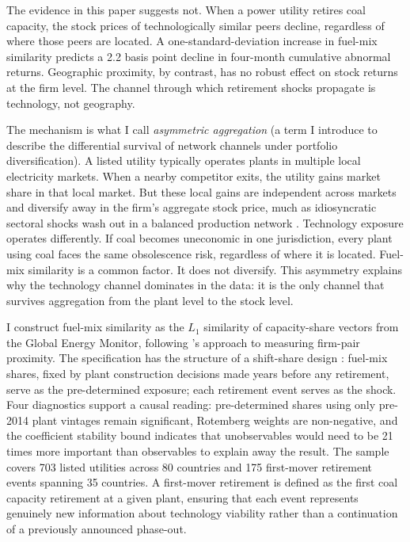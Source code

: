 \documentclass[12pt,a4paper]{article}
\begin{document}
The evidence in this paper suggests not. When a power utility retires coal capacity, the stock prices of technologically similar peers decline, regardless of where those peers are located. A one-standard-deviation increase in fuel-mix similarity predicts a 2.2 basis point decline in four-month cumulative abnormal returns. Geographic proximity, by contrast, has no robust effect on stock returns at the firm level. The channel through which retirement shocks propagate is technology, not geography.

The mechanism is what I call \emph{asymmetric aggregation} (a term I introduce to describe the differential survival of network channels under portfolio diversification). A listed utility typically operates plants in multiple local electricity markets. When a nearby competitor exits, the utility gains market share in that local market. But these local gains are independent across markets and diversify away in the firm's aggregate stock price, much as idiosyncratic sectoral shocks wash out in a balanced production network \citep{AcemogluCarvalhoOzdaglarTahbazSalehi2012}. Technology exposure operates differently. If coal becomes uneconomic in one jurisdiction, every plant using coal faces the same obsolescence risk, regardless of where it is located. Fuel-mix similarity is a common factor. It does not diversify. This asymmetry explains why the technology channel dominates in the data: it is the only channel that survives aggregation from the plant level to the stock level.

I construct fuel-mix similarity as the $L_1$ similarity of capacity-share vectors from the Global Energy Monitor, following \citet{HobergPhillips2016}'s approach to measuring firm-pair proximity. The specification has the structure of a shift-share design \citep{GoldsmithPinkhamSorkinSwift2020}: fuel-mix shares, fixed by plant construction decisions made years before any retirement, serve as the pre-determined exposure; each retirement event serves as the shock. Four diagnostics support a causal reading: pre-determined shares using only pre-2014 plant vintages remain significant, Rotemberg weights are non-negative, and the \citet{Oster2019} coefficient stability bound indicates that unobservables would need to be 21 times more important than observables to explain away the result. The sample covers 703 listed utilities across 80 countries and 175 first-mover retirement events spanning 35 countries. A first-mover retirement is defined as the first coal capacity retirement at a given plant, ensuring that each event represents genuinely new information about technology viability rather than a continuation of a previously announced phase-out.
\end{document}
